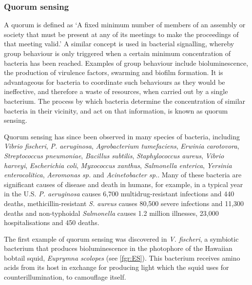 \subsubsection{Quorum sensing}

A quorum is defined as `A fixed minimum number of members of an assembly or society that must be present at any of its meetings to make the proceedings of that meeting valid.' \cite{Dictionary}  
A similar concept is used in bacterial signalling, whereby group behaviour is only triggered when a certain minimum concentration of bacteria has been reached. Examples of group behaviour include bioluminescence, the production of virulence factors, swarming and biofilm formation\cite{Miller2001}.  
It is advantageous for bacteria to coordinate such behaviours as they would be ineffective, and therefore a waste of resources, when carried out by a single bacterium.
The process by which bacteria determine the concentration of similar bacteria in their vicinity, and act on that information, is known as quorum sensing.

Quorum sensing has since been observed in many species of bacteria, including \textit{Vibrio fischeri}, \textit{P. aeruginosa}, \textit{Agrobacterium tumefaciens}, \textit{Erwinia carotovora}, \textit{Streptococcus pneumoniae}, \textit{Bacillus subtilis}, \textit{Staphylococcus aureus}, \textit{Vibrio harveyi}, \textit{Escherichia coli}, \textit{Myxococcus xanthus}, \textit{Salmonella enterica}, \textit{Yersinia enterocolitica}, \textit{Aeromonas sp.} and \textit{Acinetobacter sp.}\cite{Miller2001,Fuqua1994,Waters2005,Atkinson2006,Chan2011,Sauer2002,Michael2001,Ahmer2004,Nealson1970,Visick2006}. 
Many of these bacteria are significant causes of disease and death in humans, for example, in a typical year in the U.S. \textit{P. aeruginosa} causes 6,700 multidrug-resistant infections and 440 deaths, methicillin-resistant \textit{S. aureus} causes 80,500 severe infections and 11,300 deaths and non-typhoidal \textit{Salmonella} causes 1.2 million illnesses, 23,000
hospitalisations and 450 deaths\cite{ResistanceUS}.


The first example of quorum sensing was discovered in \textit{V. fischeri}, a symbiotic bacterium that produces bioluminescence in the photophore of the Hawaiian bobtail squid, \textit{Euprymna scolopes} \cite{Nealson1970,Miller2001,Visick2006} (see \ref{fgr:ES}). This bacterium receives amino acids\cite{Graf1998, Lemus2000} from its host in exchange for producing light which the squid uses for counterillumination, to camouflage itself\cite{Jones2004}. 

